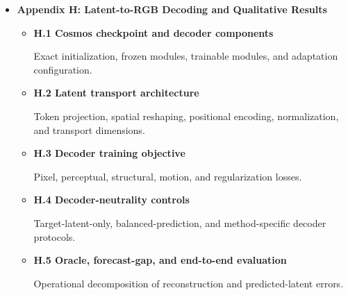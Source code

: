 \begin{itemize}
\begin{itemize}
    Defines action, taxonomy, rollout, temporal-order, arrow-of-time,
    playback-pace, temporal-correspondence, and exposure-bias
    diagnostics under a common aggregation protocol.

    \item \textbf{E.4 Paired bootstrap inference}

    Defines the evaluation estimand and the paired bootstrap.

    \item \textbf{E.5 Metric sensitivity and complete numerical results}

    Reports horizon and masking curves, normalization
    sensitivity, cross-scale ranking robustness, and the complete V-JEPA~2.1 (2B) and V-JEPA~2.1 (1B)
    numerical scorecards.

\end{itemize}


\iffalse  %
\item \textbf{Appendix H: Latent-to-RGB Decoding and Qualitative Results}
\begin{itemize}
    \item \textbf{H.1 Cosmos checkpoint and decoder components}
    
    Exact initialization, frozen modules, trainable modules, and
    adaptation configuration.

    \item \textbf{H.2 Latent transport architecture}
    
    Token projection, spatial reshaping, positional encoding,
    normalization, and transport dimensions.

    \item \textbf{H.3 Decoder training objective}
    
    Pixel, perceptual, structural, motion, and regularization losses.

    \item \textbf{H.4 Decoder-neutrality controls}
    
    Target-latent-only, balanced-prediction, and method-specific
    decoder protocols.

    \item \textbf{H.5 Oracle, forecast-gap, and end-to-end evaluation}
    
    Operational decomposition of reconstruction and predicted-latent
    errors.


\end{itemize}
\end{itemize}
